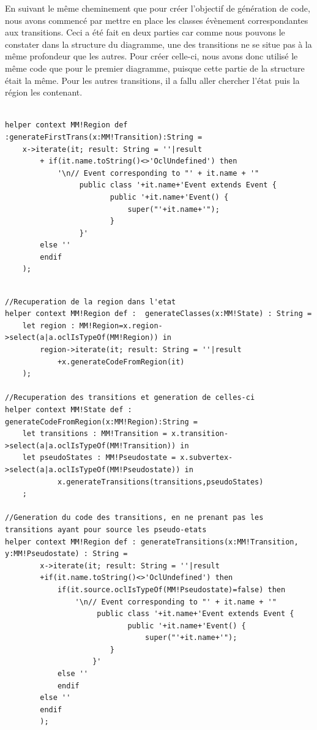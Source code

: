 \documentclass[french, 12pt, a4paper]{article}
\begin{document}
    En suivant le même cheminement que pour créer l'objectif de génération de code, nous avons commencé par mettre en place les classes évènement correspondantes aux transitions. Ceci a été fait en deux parties car comme nous pouvons le constater dans la structure du diagramme, une des transitions ne se situe pas à la même profondeur que les autres. Pour créer celle-ci, nous avons donc utilisé le même code que pour le premier diagramme, puisque cette partie de la structure était la même. Pour les autres transitions, il a fallu aller chercher l'état puis la région les contenant.
    
    \begin{lstlisting}[caption={Création de la classe évènement de la première transition, la moins profonde},basicstyle=\small]

helper context MM!Region def :generateFirstTrans(x:MM!Transition):String = 
	x->iterate(it; result: String = ''|result
		+ if(it.name.toString()<>'OclUndefined') then 
            '\n// Event corresponding to "' + it.name + '"
            	 public class '+it.name+'Event extends Event {
            			public '+it.name+'Event() {
            	 			super("'+it.name+'");
            	 	    }
            	 }'
		else '' 
		endif
	);
    \end{lstlisting}
    
    \begin{lstlisting}[caption={Création des autres classes d'évenements},basicstyle=\small]

//Recuperation de la region dans l'etat
helper context MM!Region def :  generateClasses(x:MM!State) : String = 
	let region : MM!Region=x.region->select(a|a.oclIsTypeOf(MM!Region)) in 
		region->iterate(it; result: String = ''|result
			+x.generateCodeFromRegion(it)
	);

//Recuperation des transitions et generation de celles-ci
helper context MM!State def : generateCodeFromRegion(x:MM!Region):String = 
	let transitions : MM!Transition = x.transition->select(a|a.oclIsTypeOf(MM!Transition)) in
	let pseudoStates : MM!Pseudostate = x.subvertex->select(a|a.oclIsTypeOf(MM!Pseudostate)) in
			x.generateTransitions(transitions,pseudoStates)
	;

//Generation du code des transitions, en ne prenant pas les transitions ayant pour source les pseudo-etats
helper context MM!Region def : generateTransitions(x:MM!Transition, y:MM!Pseudostate) : String = 
		x->iterate(it; result: String = ''|result
		+if(it.name.toString()<>'OclUndefined') then 
			if(it.source.oclIsTypeOf(MM!Pseudostate)=false) then
                '\n// Event corresponding to "' + it.name + '"
                	 public class '+it.name+'Event extends Event {
                			public '+it.name+'Event() {
                	 			super("'+it.name+'");
                	 	}
                	}'
			else '' 
			endif
		else ''
		endif
		);
    \end{lstlisting}
    
\end{document}
